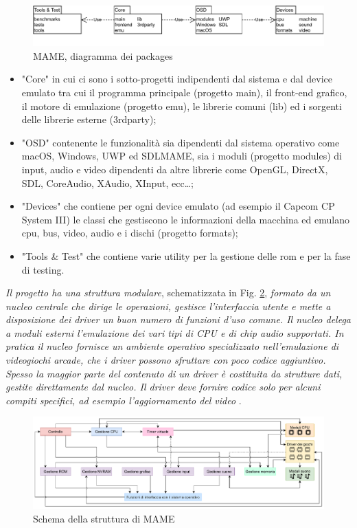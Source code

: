 \begin{figure}[H]
	\includegraphics[width=\linewidth]{immagini/mame_arch}
	\caption{MAME, diagramma dei packages}
	\label{fig:mame_arch}
\end{figure}

\begin{itemize}
	\item "Core" in cui ci sono i sotto-progetti indipendenti dal sistema e dal device emulato tra cui il programma principale (progetto main), il front-end grafico, il motore di emulazione (progetto emu), le librerie comuni (lib) ed i sorgenti delle librerie esterne (3rdparty);
	\item "OSD" contenente le funzionalità sia dipendenti dal sistema operativo come macOS, Windows, UWP ed SDLMAME, sia i moduli (progetto modules) di input, audio e video dipendenti da altre librerie come OpenGL, DirectX, SDL, CoreAudio, XAudio, XInput, ecc\dots;
	\item "Devices" che contiene per ogni device emulato (ad esempio il Capcom CP System III) le classi che gestiscono le informazioni della macchina ed emulano cpu, bus, video, audio e i dischi (progetto formats);
	\item "Tools \& Test" che contiene varie utility per la gestione delle rom e per la fase di testing.
\end{itemize}

\textit{Il progetto ha una struttura modulare}, schematizzata in Fig. \ref{fig:mame_schema_moduli_d}, \textit{formato da un nucleo centrale che dirige le operazioni, gestisce l’interfaccia utente e mette a disposizione dei driver un buon numero di funzioni d'uso comune. Il nucleo delega a moduli esterni l'emulazione dei vari tipi di CPU e di chip audio supportati. In pratica il nucleo fornisce un ambiente operativo specializzato nell'emulazione di videogiochi arcade, che i driver possono sfruttare con poco codice aggiuntivo. Spesso la maggior parte del contenuto di un driver è costituita da strutture dati, gestite direttamente dal nucleo. Il driver deve fornire codice solo per alcuni compiti specifici, ad esempio l'aggiornamento del video} \parencite{Il_progetto_MAME}.

\begin{figure}[H]
	\includegraphics[width=\linewidth]{immagini/mame_schema_moduli_d}
	\caption{Schema della struttura di MAME}
	\label{fig:mame_schema_moduli_d}
\end{figure}

